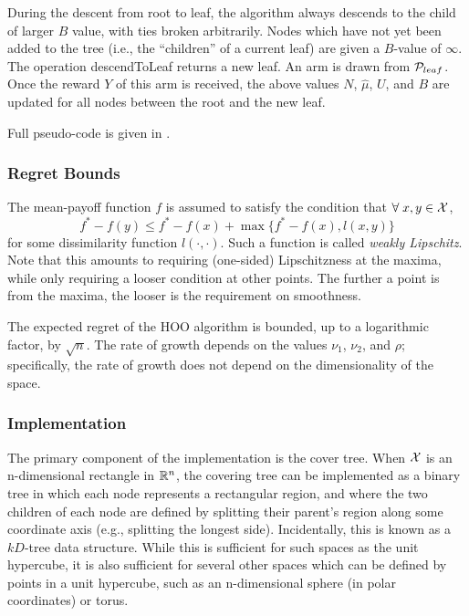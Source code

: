 During the descent from root to leaf, the algorithm always descends to
the child of larger $B$ value, with ties broken arbitrarily. Nodes
which have not yet been added to the tree (i.e., the ``children'' of a
current leaf) are given a $B$-value of $\infty$. The operation
descendToLeaf returns a new leaf. An arm is drawn from
${\mathcal{P}}_{leaf}$. Once the reward $Y$ of this arm is received, the above
values $N$, $\hat{\mu}$, $U$, and $B$ are updated for all nodes
between the root and the new leaf.

Full pseudo-code is given in .

\subsubsection{Regret Bounds}
The mean-payoff function $f$ is assumed to satisfy the condition that
$\forall \; x,y \in {\mathcal{X}}$,
\begin{equation*}
  f^* - f(y) \leq f^* - f(x) + \max \{f^* - f(x), l(x,y) \}
\end{equation*}
for some dissimilarity function $l(\cdot, \cdot)$. Such a function is
called \emph{weakly Lipschitz}. Note that this amounts to requiring
(one-sided) Lipschitzness at the maxima, while only requiring a looser
condition at other points. The further a point is from the maxima, the
looser is the requirement on smoothness.

The expected regret of the HOO algorithm is bounded, up to a
logarithmic factor, by $\sqrt{n}$. The rate of growth depends on
the values $\nu_1$, $\nu_2$, and $\rho$; specifically, the rate of
growth does not depend on the dimensionality of the space.

\subsubsection{Implementation}
The primary component of the implementation is the cover tree. When
${\mathcal{X}}$ is an n-dimensional rectangle in $\mathbb{R}^n$, the covering tree
can be implemented as a binary tree in which each node represents a
rectangular region, and where the two children of each node are
defined by splitting their parent's region along some coordinate axis
(e.g., splitting the longest side). Incidentally, this is known as a
$kD$-tree data structure. While this is sufficient for such spaces as
the unit hypercube, it is also sufficient for several other spaces
which can be defined by points in a unit hypercube, such as an
n-dimensional sphere (in polar coordinates) or torus.



